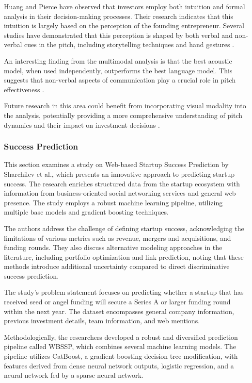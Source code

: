 \documentclass[a4paper, oneside]{discothesis}
\begin{document}
Huang and Pierce \cite{huang_pierce} have observed that investors employ both intuition and formal analysis in their decision-making processes. Their research indicates that this intuition is largely based on the perception of the founding entrepreneur. Several studies have demonstrated that this perception is shaped by both verbal and non-verbal cues in the pitch, including storytelling techniques and hand gestures \cite{verbal_nonverbal_cues}.

An interesting finding from the multimodal analysis is that the best acoustic model, when used independently, outperforms the best language model. This suggests that non-verbal aspects of communication play a crucial role in pitch effectiveness \cite{acoustic_vs_language}.

Future research in this area could benefit from incorporating visual modality into the analysis, potentially providing a more comprehensive understanding of pitch dynamics and their impact on investment decisions \cite{visual_modality_potential}.

\subsubsection{Success Prediction}

This section examines a study on Web-based Startup Success Prediction by Sharchilev et al., which presents an innovative approach to predicting startup success. The research enriches structured data from the startup ecosystem with information from business-oriented social networking services and general web presence. The study employs a robust machine learning pipeline, utilizing multiple base models and gradient boosting techniques.

The authors address the challenge of defining startup success, acknowledging the limitations of various metrics such as revenue, mergers and acquisitions, and funding rounds. They also discuss alternative modeling approaches in the literature, including portfolio optimization and link prediction, noting that these methods introduce additional uncertainty compared to direct discriminative success prediction.

The study's problem statement focuses on predicting whether a startup that has received seed or angel funding will secure a Series A or larger funding round within the next year. The dataset encompasses general company information, previous investment details, team information, and web mentions.

Methodologically, the researchers developed a robust and diversified prediction pipeline called WBSSP, which combines several machine learning models. The pipeline utilizes CatBoost, a gradient boosting decision tree modification, with features derived from dense neural network outputs, logistic regression, and a neural network fed by a sparse neural network.
\end{document}
